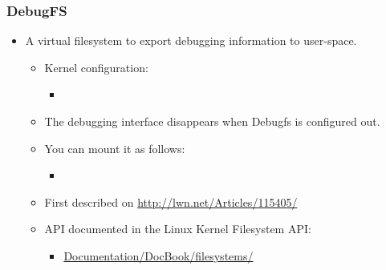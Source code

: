 \begin{frame}
  \frametitle{DebugFS}
  \begin{itemize}
  \item A virtual filesystem to export debugging information to
    user-space.
    \begin{itemize}
    \item Kernel configuration: 
      \begin{itemize}
      \item {}
      \end{itemize}
    \item The debugging interface disappears when Debugfs is
      configured out.
    \item You can mount it as follows:
      \begin{itemize}
      \item {}
      \end{itemize}
    \item First described on \url{http://lwn.net/Articles/115405/}
    \item API documented in the Linux Kernel Filesystem API:
      \begin{itemize}
      \item \href{http://free-electrons.com/kerneldoc/latest/DocBook/filesystems/}
          {Documentation/DocBook/filesystems/}
      \end{itemize}
    \end{itemize}
  \end{itemize}
\end{frame}

